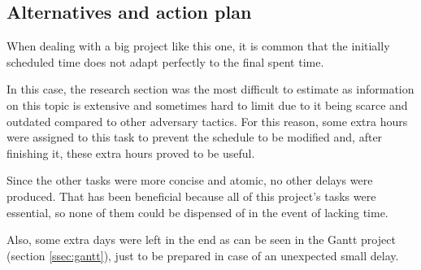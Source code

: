\subsection{Alternatives and action plan}
\label{ssec:alternativesSchedule}
When dealing with a big project like this one, it is common that the initially scheduled time does not adapt perfectly to the final spent time.

In this case, the research section was the most difficult to estimate as information on this topic is extensive and sometimes hard to limit due to it being scarce and outdated compared to other adversary tactics. For this reason, some extra hours were assigned to this task to prevent the schedule to be modified and, after finishing it, these extra hours proved to be useful.

Since the other tasks were more concise and atomic, no other delays were produced. That has been beneficial because all of this project's tasks were essential, so none of them could be dispensed of in the event of lacking time.

Also, some extra days were left in the end as can be seen in the Gantt project (section \ref{ssec:gantt}), just to be prepared in case of an unexpected small delay.
